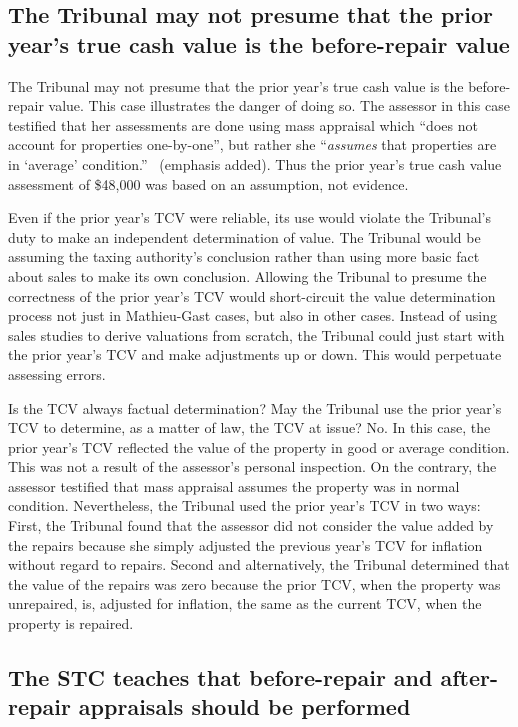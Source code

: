 \documentclass[12pt,\documentclassflag]{michiganCourtOfAppealsBrief}
\begin{document}
\subsection{The Tribunal may not presume that the prior year's true cash value is the before-repair value}

The Tribunal may not presume that the prior year's true cash value is the before-repair value. This case illustrates the danger of doing so. The assessor in this case testified that her assessments are done using mass appraisal which ``does not account for properties one-by-one'', but rather she ``{\em assumes} that properties are in `average' condition.'' \ (emphasis added). Thus the prior year's true cash value assessment of \$48,000 was based on an assumption, not evidence.

Even if the prior year's TCV were reliable, its use would violate the Tribunal's duty to make an independent determination of value. The Tribunal would be assuming the taxing authority's conclusion rather than using more basic fact about sales to make its own conclusion. Allowing the Tribunal to presume the correctness of the prior year's TCV would short-circuit the value determination process not just in Mathieu-Gast cases, but also in other cases. Instead of using sales studies to derive valuations from scratch, the Tribunal could just start with the prior year's TCV and make adjustments up or down. This would perpetuate assessing errors.

Is the TCV always factual determination? 
May the Tribunal use the prior year's TCV to determine, as a matter of law, the TCV at issue? No. 
In this case, the prior year's TCV reflected the value of the property in good or average condition. This was not a result of the assessor's personal inspection. On the contrary, the assessor testified that mass appraisal assumes the property was in normal condition. Nevertheless, the Tribunal used the prior year's TCV in two ways: First, the Tribunal found that the assessor did not consider the value added by the repairs because she simply adjusted the previous year's TCV for inflation without regard to repairs. Second and alternatively, the Tribunal determined that the value of the repairs was zero because the prior TCV, when the property was unrepaired, is, adjusted for inflation, the same as the current TCV, when the property is repaired.

\subsection{The STC teaches that before-repair and after-repair appraisals should be performed}
\end{document}
